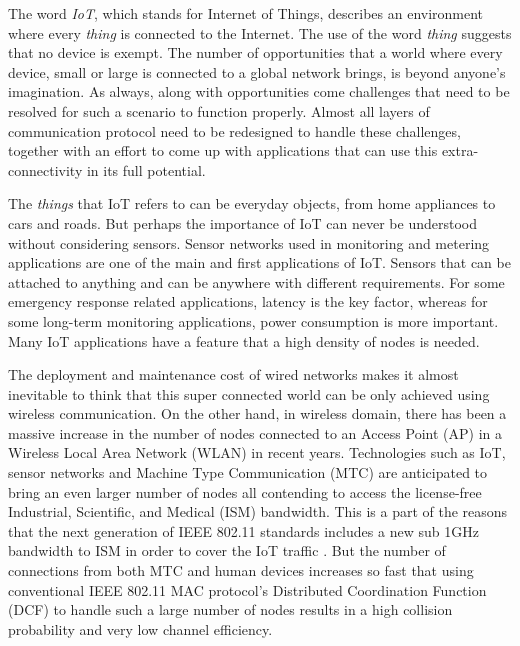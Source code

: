 \label{chapter:introduction}

The word \textit{IoT}, which stands for Internet of Things, describes an environment where every \textit{thing} is connected to the Internet. The use of the word \textit{thing} suggests that no device is exempt. The number of opportunities that a world where every device, small or large is connected to a global network brings, is beyond anyone's imagination. As always, along with opportunities come challenges that need to be resolved for such a scenario to function properly. Almost all layers of communication protocol need to be redesigned to handle these challenges, together with an effort to come up with applications that can use this extra-connectivity in its full potential.

The \textit{things} that IoT refers to can be everyday objects, from home appliances to cars and roads. But perhaps the importance of IoT can never be understood without considering sensors. Sensor networks used in monitoring and metering applications are one of the main and first applications of IoT. Sensors that can be attached to anything and can be anywhere with different requirements. For some emergency response related applications, latency is the key factor, whereas for some long-term monitoring applications, power consumption is more important. Many IoT applications have a feature that a high density of nodes is needed.


The deployment and maintenance cost of wired networks makes it almost inevitable to think that this super connected world can be only achieved using wireless communication. On the other hand, in wireless domain, there has been a massive increase in the number of nodes connected to an Access Point (AP) in a Wireless Local Area Network (WLAN) in recent years. Technologies such as IoT, sensor networks and Machine Type Communication (MTC) are anticipated to bring an even larger number of nodes all contending to access the license-free Industrial, Scientific, and Medical (ISM) bandwidth. This is a part of the reasons that the next generation of IEEE 802.11 standards includes a new sub 1GHz bandwidth to ISM in order to cover the IoT traffic \cite{Req80211ah}. But the number of connections from both MTC and human devices increases so fast that using conventional IEEE 802.11 MAC protocol's Distributed Coordination Function (DCF) to handle such a large number of nodes results in a high collision probability and very low channel efficiency.

